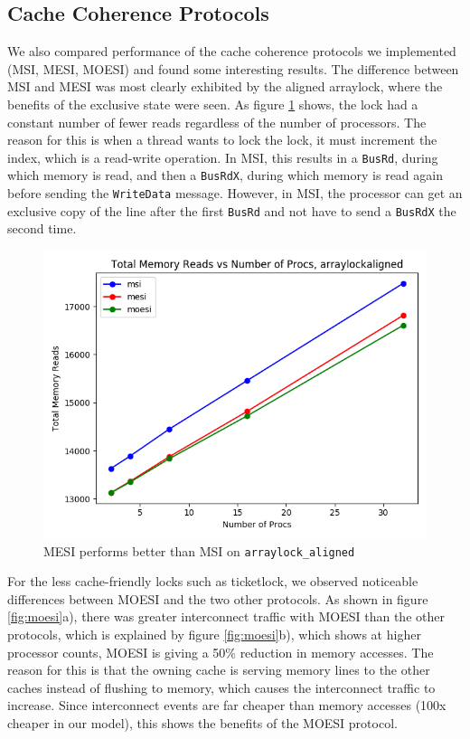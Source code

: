 \documentclass{article}
\def\inline{\lstinline[language=C++, basicstyle=\ttfamily]}
\begin{document}
\subsection{Cache Coherence Protocols}

We also compared performance of the cache coherence protocols we implemented (MSI, MESI, MOESI) and found some interesting results. The difference between MSI and MESI was most clearly exhibited by the aligned arraylock, where the benefits of the exclusive state were seen.  As figure \ref{fig:mesi} shows, the lock had a constant number of fewer reads regardless of the number of processors.  The reason for this is when a thread wants to lock the lock, it must increment the index, which is a read-write operation.  In MSI, this results in a \inline{BusRd}, during which memory is read, and then a \inline{BusRdX}, during which memory is read again before sending the \inline{WriteData} message.  However, in MSI, the processor can get an exclusive copy of the line after the first \inline{BusRd} and not have to send a \inline{BusRdX} the second time.

\begin{figure}[h]
\centering
\includegraphics[width=.5\textwidth]{figures/arraylock_mem.png}
\caption{MESI performs better than MSI on \inline{arraylock_aligned}}
\label{fig:mesi}
\end{figure}

For the less cache-friendly locks such as ticketlock, we observed noticeable differences between MOESI and the two other protocols.  As shown in figure \ref{fig:moesi}a), there was greater interconnect traffic with MOESI than the other protocols, which is explained by figure \ref{fig:moesi}b), which shows at higher processor counts, MOESI is giving a 50\% reduction in memory accesses.  The reason for this is that the owning cache is serving memory lines to the other caches instead of flushing to memory, which causes the interconnect traffic to increase. Since interconnect events are far cheaper than memory accesses (100x cheaper in our model), this shows the benefits of the MOESI protocol.
\end{document}
